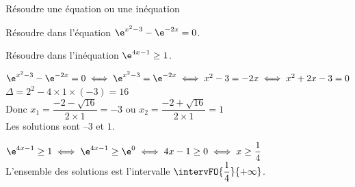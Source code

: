         \begin{bmethodet}{Résoudre une équation ou une inéquation}
            \begin{enumMet}
                \item Résoudre dans \R l'équation $\e^{x^2-3}-\e^{-2x}=0$.
                \item Résoudre dans \R l'inéquation $\e^{4x-1}\ge 1$.
            \end{enumMet}
            \begin{enumMet}
                \item $\e^{x^2-3}-\e^{-2x}=0 \iff \e^{x^2-3}=\e^{-2x} \iff x^2-3=-2x \iff x^2+2x-3=0$\\
                $\Delta=2^2-4\times1\times(-3)=16$\\
                Donc $x_1=\dfrac{-2-\sqrt{16}}{2\times1}=-3$ ou $x_2=\dfrac{-2+\sqrt{16}}{2\times1}=1$\\
                Les solutions sont $–3$ et $1$.
                \item $\e^{4x-1}\ge 1 \iff \e^{4x-1}\ge \e^0 \iff 4x-1\ge 0 \iff x\ge \dfrac{1}{4}$\\
                L'ensemble des solutions est l'intervalle $\intervFO{\dfrac{1}{4}}{+\infty}$.
            \end{enumMet}
        \end{bmethodet}
